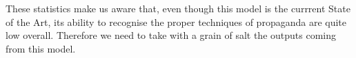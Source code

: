 These statistics make us aware that, even though this model is the currrent State of the Art, its ability to recognise the proper techniques of propaganda are quite low overall.
Therefore we need to take with a grain of salt the outputs coming from this model.









